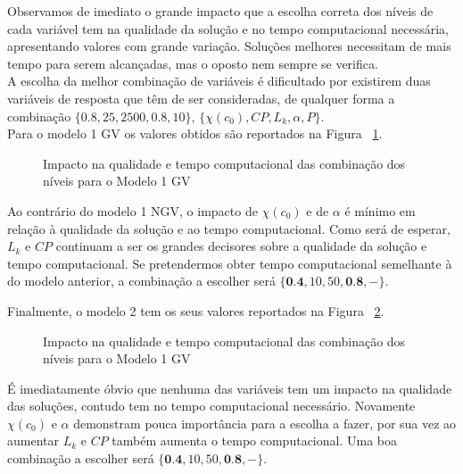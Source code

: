 Observamos de imediato o grande impacto que a escolha correta dos níveis de cada variável tem na qualidade da solução e no tempo computacional necessária, apresentando valores com grande variação. Soluções melhores necessitam de mais tempo para serem alcançadas, mas o oposto nem sempre se verifica.\\

A escolha da melhor combinação de variáveis é dificultado por existirem duas variáveis de resposta que têm de ser consideradas, de qualquer forma a combinação $\{0.8, 25, 2500, 0.8, 10\}$, $\{\chi(c_{0}), CP, L_{k}, \alpha, P\}$.\\

Para o modelo 1 GV os valores obtidos são reportados na Figura ~\ref{fig:comb_prob1_mod1GV}.\\

\begin{figure}[h]
	\centering
	\caption{Impacto na qualidade e tempo computacional das combinação dos níveis para o Modelo 1 GV}
	\label{fig:comb_prob1_mod1GV}
\end{figure}

Ao contrário do modelo 1 NGV, o impacto de $\chi(c_{0})$ e de $\alpha$ é mínimo em relação à qualidade da solução e ao tempo computacional. Como será de esperar, $L_{k}$ e $CP$ continuam a ser os grandes decisores sobre a qualidade da solução e tempo computacional. Se pretendermos obter tempo computacional semelhante à do modelo anterior, a combinação a escolher será $\{\textbf{0.4}, 10, 50, \textbf{0.8}, -\}$.

Finalmente, o modelo 2 tem os seus valores reportados na Figura ~\ref{fig:comb_prob1_mod2GV}.\\

\begin{figure}[h]
	\centering
	\caption{Impacto na qualidade e tempo computacional das combinação dos níveis para o Modelo 1 GV}
	\label{fig:comb_prob1_mod2GV}
\end{figure}

É imediatamente óbvio que nenhuma das variáveis tem um impacto na qualidade das soluções, contudo tem no tempo computacional necessário. Novamente $\chi(c_{0})$ e $\alpha$ demonstram pouca importância para a escolha a fazer, por sua vez ao aumentar $L_{k}$ e $CP$ também aumenta o tempo computacional. Uma boa combinação a escolher será $\{\textbf{0.4}, 10, 50, \textbf{0.8}, -\}$.\\

